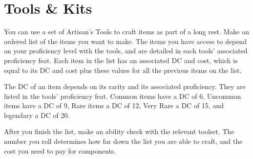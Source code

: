 \section{Tools \& Kits} \label{sec::toolsandkits}
You can use a set of Artisan's Tools to craft items as part of a long rest.
Make an ordered list of the items you want to make.
The items you have access to depend on your proficiency level with the tools, and are detailed in each tools' associated proficiency feat.
Each item in the list has an associated DC and cost, which is equal to its DC and cost plus these values for all the previous items on the list.

The DC of an item depends on its rarity and its associated proficiency.
They are listed in the tools' proficiency feat.
Common items have a DC of 6, Uncommon items have a DC of 9, Rare items a DC of 12, Very Rare a DC of 15, and legendary a DC of 20.

After you finish the list, make an ability check with the relevant toolset.
The number you roll determines how far down the list you are able to craft, and the cost you need to pay for components.

